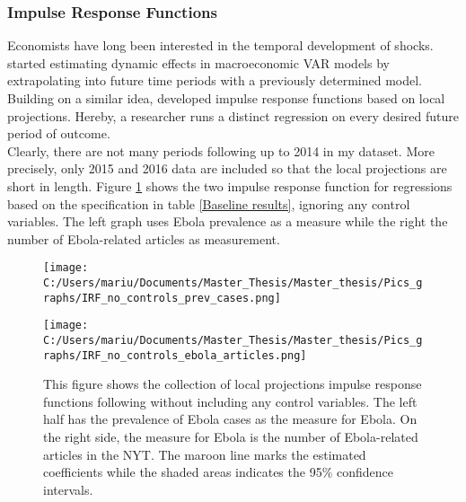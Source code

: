 \documentclass{article}
\begin{document}
\subsubsection{Impulse Response Functions}

Economists have long been interested in the temporal development of shocks. \cite{blanchard1988dynamic} started estimating dynamic effects in
macroeconomic VAR models by extrapolating into future time periods with a previously determined model. Building on a similar idea, \cite{jorda2005estimation} developed impulse response functions based on local projections. Hereby, a researcher runs a distinct regression on every desired future period of outcome. \\
Clearly, there are not many periods following up to 2014 in my dataset. More precisely, only 2015 and 2016 data are included so that the local projections are short in length. Figure \ref{First Stage IRF - no controls} shows the two impulse response function for regressions based on the specification in table \ref{Baseline results}, ignoring any control variables. The left graph uses Ebola prevalence as a measure while the right the number of Ebola-related articles as measurement.

\begin{figure}[!ht]
\begin{center}
\begin{minipage}[t]{0.9\textwidth}
\begin{minipage}[t]{0.5\linewidth}\vspace{0pt} 
\texttt{[image: C:/Users/mariu/Documents/Master\_Thesis/Master\_thesis/Pics\_graphs/IRF\_no\_controls\_prev\_cases.png]}\\
\end{minipage}\hfill%
\begin{minipage}[t]{0.5\linewidth}\vspace{0pt} 
\texttt{[image: C:/Users/mariu/Documents/Master\_Thesis/Master\_thesis/Pics\_graphs/IRF\_no\_controls\_ebola\_articles.png]}\\
\end{minipage}\hfill%
\caption{This figure shows the collection of local projections impulse response functions following \cite{jorda2005estimation} without including any control variables. The left half has the prevalence of Ebola cases as the measure for Ebola. On the right side, the measure for Ebola is the number of Ebola-related articles in the NYT. The maroon line marks the estimated coefficients while the shaded areas indicates the 95\% confidence intervals.}
\label{First Stage IRF - no controls}
\end{minipage}
\end{center}
\end{figure}
\end{document}
